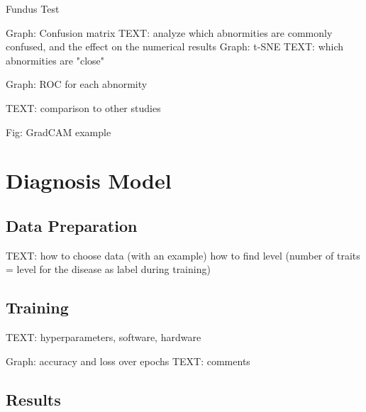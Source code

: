 \documentclass{article}
\begin{document}
				\begin{table}[htbp]
					\centering
					\caption{Fundus Test}
					\label{tb:Fundus_test}
				\end{table}
					
				Graph: Confusion matrix
				TEXT: analyze which abnormities are commonly confused, and the effect on the numerical results
				Graph: t-SNE
				TEXT: which abnormities are "close"
				
				Graph: ROC for each abnormity
				
				TEXT: comparison to other studies
				
			Fig: GradCAM example
		
	\section{Diagnosis Model}
	
		\subsection{Data Preparation}
		
			TEXT: how to choose data (with an example)
			how to find level (number of traits = level for the disease as label during training)
			
		
		\subsection{Training}
			
			TEXT: hyperparameters, software, hardware
			
			Graph: accuracy and loss over epochs
			TEXT: comments
				
				
		\subsection{Results}
			
\end{document}
